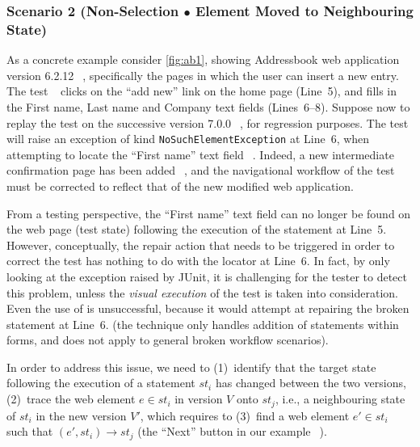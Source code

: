 \subsubsection{Scenario 2 (Non-Selection $\bullet$ Element Moved to Neighbouring State)}
As a concrete example consider \autoref{fig:ab1}, showing Addressbook web application version 6.2.12~\textcircled{}, specifically the pages in which the user can insert a new entry. The test~\textcircled{} clicks on the ``add new'' link on the home page (Line~5), and fills in the First name, Last name and Company text fields (Lines~6--8).
Suppose now to replay the test on the successive version 7.0.0~\textcircled{}, for regression purposes. The test will raise an exception of kind \texttt{NoSuchElementException} at Line~6, when attempting to locate the ``First name'' text field~\textcircled{}. 
Indeed, a new intermediate confirmation page has been added~\textcircled{}, and the navigational workflow of the test must be corrected to reflect that of the new modified web application.

From a testing perspective, the ``First name'' text field can no longer be found on the web page (test state) following the execution of the statement at Line~5. However, conceptually, the repair action that needs to be triggered in order to correct the test has nothing to do with the locator at Line~6.
In fact, by only looking at the exception raised by JUnit, it is  challenging for the tester to detect this problem, unless the \textit{visual execution} of the test is taken into consideration.
%
Even the use of \water is unsuccessful, because it would attempt at repairing the broken statement at Line~6. (the technique only handles addition of statements within forms, and does not apply to general broken workflow scenarios).

In order to address this issue, we need to (1)~identify that the target state following the execution of a statement $st_i$ has changed between the two versions, (2)~trace the web element $e \in st_i$ in version $V$ onto $st_j$, i.e., a neighbouring state of $st_i$  in the new version $V'$, which requires to (3)~find  a web element $e' \in st_i$ such that $(e', st_i) \rightarrow st_j$ (the ``Next'' button in our example~\textcircled{}).

